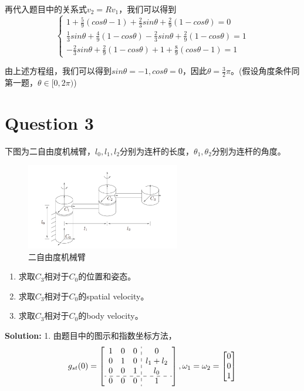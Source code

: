 \documentclass{ctexart}
\begin{document}
再代入题目中的关系式$v_2 = Rv_1$，我们可以得到
\begin{equation*}
	\begin{cases}
		1+\frac{5}{9}(cos\theta -1)+\frac{2}{3} sin\theta + \frac{2}{9}(1-cos\theta) = 0\\
		\frac{1}{3}sin\theta + \frac{4}{9}(1-cos\theta) - \frac{2}{3}sin\theta + \frac{2}{9}(1-cos\theta) = 1\\
		-\frac{2}{3}sin\theta + \frac{2}{9}(1-cos\theta) + 1 + \frac{8}{9}(cos\theta -1) = 1
	\end{cases}
\end{equation*}

由上述方程组，我们可以得到$sin \theta = -1,cos \theta = 0$，因此$\theta = \frac{3}{2}\pi$。(假设角度条件同第一题，$\theta \in [0,2\pi)$)
	
\section*{Question 3}
下图为二自由度机械臂，$l_0,l_1,l_2$分别为连杆的长度，$\theta_1,\theta_2$分别为连杆的角度。

\begin{figure}[h]
	\centering
	\includegraphics[width=0.6\textwidth]{Image/1.png}
	\caption{二自由度机械臂}
\end{figure}

\begin{enumerate}
	\item 求取$C_3$相对于$C_0$的位置和姿态。
	\item 求取$C_3$相对于$C_0$的spatial velocity。
	\item 求取$C_3$相对于$C_0$的body velocity。
\end{enumerate}

\textbf{Solution:}
1. 由题目中的图示和指数坐标方法，
\begin{equation*}
	g_{st}(0) = \left[\begin{array}{ccc:c}
		1 & 0 & 0 & 0\\
		0 & 1 & 0 & l_1+l_2\\
		0 & 0 & 1 & l_0\\
		\hdashline 
		0 & 0 & 0 & 1\\ 
		\end{array}\right],\omega_1 = \omega_2 = \begin{bmatrix}
			0 \\
			0 \\
			1
		\end{bmatrix}
\end{equation*}
\end{document}
